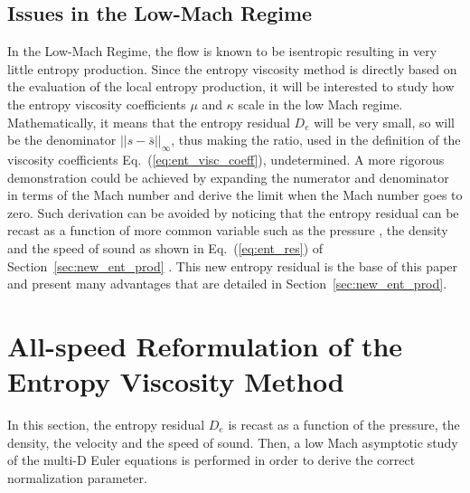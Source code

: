 \documentclass[preprint,10pt]{elsarticle}
\newcommand{\eqt}[1]{Eq.~(\ref{#1})}                     %
\newcommand{\sct}[1]{Section~\ref{#1}}                   %
\begin{document}
\subsection{Issues in the Low-Mach Regime} 
In the Low-Mach Regime, the flow is known to be isentropic resulting in very little entropy production. Since the entropy viscosity method is directly based on the evaluation of the local entropy production, it will be interested to study how the entropy viscosity coefficients $\mu$ and $\kappa$ scale in the low Mach regime. Mathematically, it means that the entropy residual $D_e$ will be very small, so will be the denominator $|| s - \bar{s} ||_{\infty}$, thus making the ratio, used in the definition of the viscosity coefficients \eqt{eq:ent_visc_coeff}, undetermined.  A more rigorous demonstration could be achieved by expanding the numerator and denominator in terms of the Mach number and derive the limit when the Mach number goes to zero. Such derivation can be avoided by noticing that the entropy residual can be recast as a function of more common variable such as the pressure , the density and the speed of sound as shown in \eqt{eq:ent_res} of \sct{sec:new_ent_prod} . This new entropy residual is the base of this paper and present many advantages that are detailed in \sct{sec:new_ent_prod}.
\section{All-speed Reformulation of the Entropy Viscosity Method} \label{sec:extension}
In this section, the entropy residual $D_e$ is recast as a function of the pressure, the density, the velocity and the speed of sound. Then, a low Mach asymptotic study of the multi-D Euler equations is performed in order to derive the correct normalization parameter. 
\end{document}
